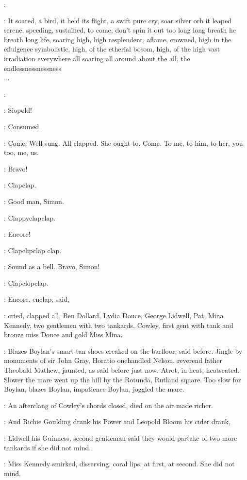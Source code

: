 \simon:

:
It soared, a bird, it held its flight, a swift pure cry, soar silver orb
it leaped serene, speeding, sustained, to come, don't spin it out too long
long breath he breath long life, soaring high, high resplendent, aflame,
crowned, high in the effulgence symbolistic, high, of the etherial bosom,
high, of the high vast irradiation everywhere all soaring all around about
the all, the endlessnessnessness%
\\
...

\simon:

\BloomInt:
Siopold!

\BloomInt:
Consumed.

\BloomInt:
Come. Well sung. All clapped. She ought to. Come. To me, to him, to
her, you too, me, us.

\lenehan:
Bravo!

:
Clapclap.

\dollard:
Good man, Simon.

:
Clappyclapclap.

\cowley:
Encore!

:
Clapclipclap clap.

\lenehan:
Sound as a bell. Bravo, Simon!

:
Clapclopclap.

:
Encore, enclap, said,

:
cried, clapped all, Ben Dollard, Lydia Douce, George
Lidwell, Pat, Mina Kennedy, two gentlemen with two tankards, Cowley,
first gent with tank and bronze miss Douce
and gold Miss Mina.

:
Blazes Boylan's smart tan shoes creaked on the barfloor, said before.
Jingle by monuments of sir John Gray, Horatio onehandled Nelson,
reverend father Theobald Mathew, jaunted, as said before just now. Atrot,
in heat, heatseated.
Slower the mare
went up the hill by the Rotunda, Rutland square. Too slow for Boylan,
blazes Boylan, impatience Boylan, joggled the mare.

:
An afterclang of Cowley's chords closed, died on the air
made richer.

:
And Richie Goulding drank his Power and Leopold Bloom his cider
drank,

:
Lidwell his Guinness, second gentleman said they would partake of
two more tankards if she did not mind.

:
Miss Kennedy smirked, disserving,
coral lips, at first, at second. She did not mind.

